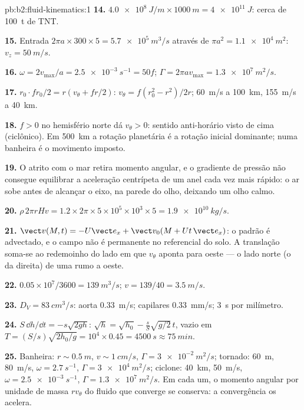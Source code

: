 \begin{solution}{pb:b2:fluid-kinematics:1}
\textbf{14.} $\qty{4.0e8}{J/m} \times \qty{1000}{m} = \qty{4e11}{J}$: cerca de
\qty{100}{t} de TNT.

\textbf{15.} Entrada $2\pi a \times 300 \times 5 = \qty{5.7e5}{m^3/s}$ através de
$\pi a^2 = \qty{1.1e4}{m^2}$: $v_z = \qty{50}{m/s}$.

\textbf{16.} $\omega = 2v_{\max}/a = \qty{2.5e-3}{s^{-1}} = 50f$; $\Gamma = 2\pi av_{\max}
= \qty{1.3e7}{m^2/s}$.

\textbf{17.} $r_0\cdot fr_0/2 = r(v_\theta + fr/2)$: $v_\theta = f(r_0^2 - r^2)/2r$;
\qty{60}{m/s} a \qty{100}{km}, \qty{155}{m/s} a \qty{40}{km}.

\textbf{18.} $f > 0$ no hemisfério norte dá $v_\theta > 0$:
sentido anti-horário visto de cima (ciclônico). Em \qty{500}{km} a
rotação planetária é a rotação inicial dominante; numa banheira é
o movimento imposto.

\textbf{19.} O atrito com o mar retira momento angular, e o
gradiente de pressão não consegue equilibrar a aceleração centrípeta de um
anel cada vez mais rápido: o ar sobe antes de alcançar o eixo, na parede
do olho, deixando um olho calmo.

\textbf{20.} $\rho\,2\pi rHv = 1.2 \times 2\pi \times 5 \times 10^5 \times 10^3 \times 5 =
\qty{1.9e10}{kg/s}$.

\textbf{21.} $\vect v(M, t) = -U\vect e_x + \vect v_0(M + Ut\,\vect e_x)$: o
padrão é advectado, e o campo não é permanente no referencial do solo.
A translação soma-se ao redemoinho do lado em que $v_\theta$ aponta para
oeste --- o lado norte (o da direita) de uma  rumo a oeste.

\textbf{22.} $0.05 \times 10^7/3600 = \qty{139}{m^3/s}$; $v = 139/40 = \qty{3.5}{m/s}$.

\textbf{23.} $D_V = \qty{83}{cm^3/s}$: aorta \qty{0.33}{m/s}; capilares
\qty{0.33}{mm/s}; \qty{3}{s} por milímetro.

\textbf{24.} $S\,\dd h/\dd t = -s\sqrt{2gh}$: $\sqrt h = \sqrt{h_0} -
\frac sS\sqrt{g/2}\,t$, vazio em $T = (S/s)\sqrt{2h_0/g} = 10^4 \times 0.45 =
\qty{4500}{s} \approx \qty{75}{min}$.

\textbf{25.} Banheira: $r \sim \qty{0.5}{m}$, $v \sim \qty{1}{cm/s}$, $\Gamma =
\qty{3e-2}{m^2/s}$; tornado: \qty{60}{m}, \qty{80}{m/s}, $\omega = \qty{2.7}{s^{-1}}$,
$\Gamma = \qty{3e4}{m^2/s}$; ciclone: \qty{40}{km}, \qty{50}{m/s}, $\omega =
\qty{2.5e-3}{s^{-1}}$, $\Gamma = \qty{1.3e7}{m^2/s}$. Em cada um, o momento
angular por unidade de massa $rv_\theta$ do fluido que converge se conserva:
a convergência os acelera.
\end{solution}
